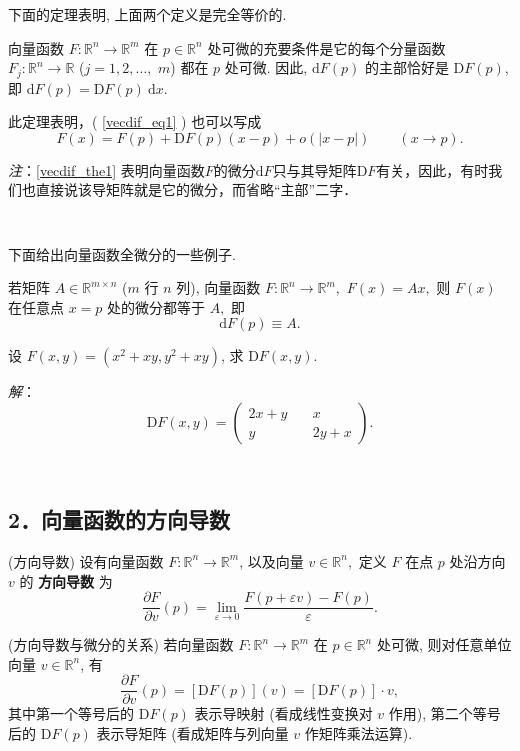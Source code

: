 下面的定理表明, 上面两个定义是完全等价的. 

\begin{theorem}{}\label{vecdif_the1}
向量函数 $F:\mathbb{R}^{n}\rightarrow\mathbb{R}^{m}$ 在 $p\in\mathbb{R}^{n}$
处可微的充要条件是它的每个分量函数 $F_{j}:\mathbb{R}^{n}\rightarrow\mathbb{R}$ ($j=1,2,\ldots,$ $m$)
都在 $p$ 处可微. 因此, $\mathrm{d}F(p)$ 的主部恰好是 $\mathrm{D}F(p)$, 即 $\mathrm{d}F(p)=\mathrm{D}F(p)~\mathrm{d}x$.

此定理表明，( \autoref{vecdif_eq1} ) 也可以写成
\[
  F(x)=F(p)+\mathrm{D}F(p)(x-p)+o(| x-p| )\quad\quad(x\rightarrow p).
\]
\end{theorem}
\textsl{注}：\autoref{vecdif_the1} 表明向量函数$F$的微分$\mathrm{d}F$只与其导矩阵$\mathrm{D}F$有关，因此，有时我们也直接说该导矩阵就是它的微分，而省略“主部”二字．

\verb| |

下面给出向量函数全微分的一些例子.
\begin{example}{}
若矩阵 $A\in\mathbb{R}^{m\times n}$ ($m$ 行 $n$ 列), 向量函数 $F:\mathbb{R}^{n}\rightarrow\mathbb{R}^{m},$
$F(x)=Ax,$ 则 $F(x)$ 在任意点 $x=p$ 处的微分都等于 $A,$ 即
\[
\mathrm{d}F(p)\equiv A.
\]
\end{example}

\begin{example}{}
设 $F(x,y)=(x^{2}+xy,y^{2}+xy)$, 求 $\mathrm{D}F(x,y).$

\textsl{解}：
$$
\mathrm{D}F(x,y)=\left(\begin{array}{cc}
2x+y\quad & x\\
y & 2y+x
\end{array}\right).
$$
\end{example}
\verb| |

\subsection{2．向量函数的方向导数}
\begin{definition}{(方向导数)}
设有向量函数 $F:\mathbb{R}^{n}\rightarrow\mathbb{R}^{m}$, 以及向量 $v\in\mathbb{R}^{n},$
定义 $F$ 在点 $p$ 处沿方向 $v$ 的 \textbf{方向导数} 为 
\[
{\displaystyle \frac{\partial F}{\partial v}(p)={\displaystyle \lim_{\varepsilon\rightarrow0}{\displaystyle \frac{F(p+\varepsilon v)-F(p)}{\varepsilon}}.}}
\]
\end{definition}

\begin{theorem}{(方向导数与微分的关系)}
若向量函数 $F:\mathbb{R}^{n}\rightarrow\mathbb{R}^{m}$ 在 $p\in\mathbb{R}^{n}$
处可微, 则对任意单位向量 $v\in\mathbb{R}^{n}$, 有
\[
\frac{\partial F}{\partial v}(p)=[\mathrm{D}F(p)](v)=[\mathrm{D}F(p)]\cdot v,
\]
其中第一个等号后的 $\mathrm{D}F(p)$ 表示导映射 (看成线性变换对 $v$ 作用), 第二个等号后的 $\mathrm{D}F(p)$
表示导矩阵 (看成矩阵与列向量 $v$ 作矩阵乘法运算).
\end{theorem}
\verb| |

